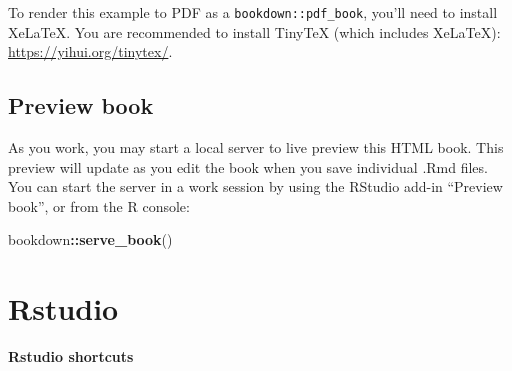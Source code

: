\documentclass[
]{book}
\newenvironment{Shaded}{\begin{snugshade}}{\end{snugshade}}
\newcommand{\FunctionTok}[1]{\textcolor[rgb]{0.13,0.29,0.53}{\textbf{#1}}}
\newcommand{\NormalTok}[1]{#1}
\newcommand{\SpecialCharTok}[1]{\textcolor[rgb]{0.81,0.36,0.00}{\textbf{#1}}}
\begin{document}
To render this example to PDF as a \texttt{bookdown::pdf\_book}, you'll need to install XeLaTeX. You are recommended to install TinyTeX (which includes XeLaTeX): \url{https://yihui.org/tinytex/}.

\section{Preview book}\label{preview-book}

As you work, you may start a local server to live preview this HTML book. This preview will update as you edit the book when you save individual .Rmd files. You can start the server in a work session by using the RStudio add-in ``Preview book'', or from the R console:

\begin{Shaded}
\begin{Highlighting}[]
\NormalTok{bookdown}\SpecialCharTok{::}\FunctionTok{serve\_book}\NormalTok{()}
\end{Highlighting}
\end{Shaded}

\chapter{Rstudio}\label{rstudio}

\textbf{Rstudio shortcuts}
\end{document}
